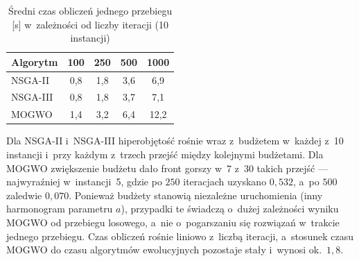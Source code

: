 \begin{table}[htbp]
    \centering
    \caption{Średni czas obliczeń jednego przebiegu [s] w~zależności od liczby iteracji (10 instancji)}
    \label{tab:wyniki_czas}
    \begin{tabular}{l c c c c}
        \hline
        Algorytm & 100 & 250 & 500 & 1000 \\
        \hline
        NSGA-II & 0{,}8 & 1{,}8 & 3{,}6 & 6{,}9 \\
        NSGA-III & 0{,}8 & 1{,}8 & 3{,}7 & 7{,}1 \\
        MOGWO & 1{,}4 & 3{,}2 & 6{,}4 & 12{,}2 \\
        \hline
    \end{tabular}
\end{table}

\FloatBarrier

Dla NSGA-II i~NSGA-III hiperobjętość rośnie wraz z~budżetem w~każdej z~10
instancji i~przy każdym z~trzech przejść między kolejnymi budżetami. Dla MOGWO
zwiększenie budżetu dało front gorszy w~7 z~30 takich przejść --- najwyraźniej
w~instancji~5, gdzie po $250$ iteracjach uzyskano $0{,}532$, a~po $500$
zaledwie $0{,}070$. Ponieważ budżety stanowią niezależne uruchomienia (inny
harmonogram parametru $a$), przypadki te świadczą o~dużej zależności wyniku
MOGWO od przebiegu losowego, a~nie o~pogarszaniu się rozwiązań w~trakcie jednego
przebiegu. Czas obliczeń rośnie liniowo z~liczbą iteracji, a~stosunek czasu
MOGWO do czasu algorytmów ewolucyjnych pozostaje stały i~wynosi ok.~$1{,}8$.
